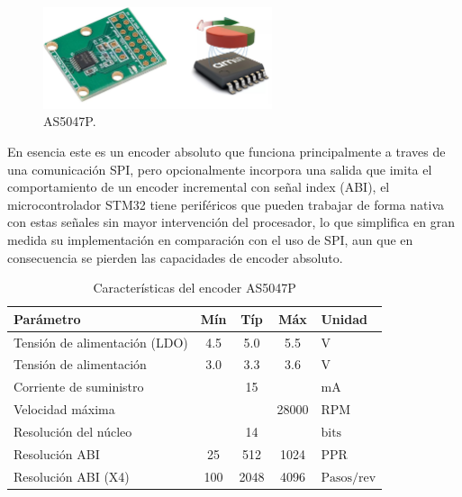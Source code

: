\documentclass[11pt]{report}
\begin{document}
\begin{figure}[ht]
	\centering
	\includegraphics[width=0.6\textwidth]{imagenes/Motor/AS5047P.jpg}
	\caption{AS5047P.}
	\label{AS5047P}
\end{figure}
\FloatBarrier


En esencia este es un encoder absoluto que funciona principalmente a traves de una comunicación SPI, pero opcionalmente incorpora una salida que imita el comportamiento de un encoder incremental con señal index (ABI), el microcontrolador STM32 tiene periféricos que pueden trabajar de forma nativa con estas señales sin mayor intervención del procesador, lo que simplifica en gran medida su implementación en comparación con el uso de SPI, aun que en consecuencia se pierden las capacidades de encoder absoluto.

\begin{table}[h!]
	\centering
	\caption{Características del encoder AS5047P}
	\begin{tabular}{l c c c l}
		\hline
		\textbf{Parámetro}            & \textbf{Mín} & \textbf{Típ} & \textbf{Máx} & \textbf{Unidad}      \\
		\hline
		Tensión de alimentación (LDO) & 4.5          & 5.0          & 5.5          & $\mathrm{V}$         \\
		Tensión de alimentación       & 3.0          & 3.3          & 3.6          & $\mathrm{V}$         \\
		Corriente de suministro       &              & 15           &              & $\mathrm{mA}$        \\
		Velocidad máxima              &              &              & 28000        & $\mathrm{RPM}$       \\
		Resolución del núcleo         &              & 14           &              & $\mathrm{bits}$      \\
		Resolución ABI                & 25           & 512          & 1024         & $\mathrm{PPR}$       \\
		Resolución ABI (X4)           & 100          & 2048         & 4096         & $\mathrm{Pasos/rev}$ \\
		\hline
	\end{tabular}
\end{table}
\FloatBarrier
\end{document}
